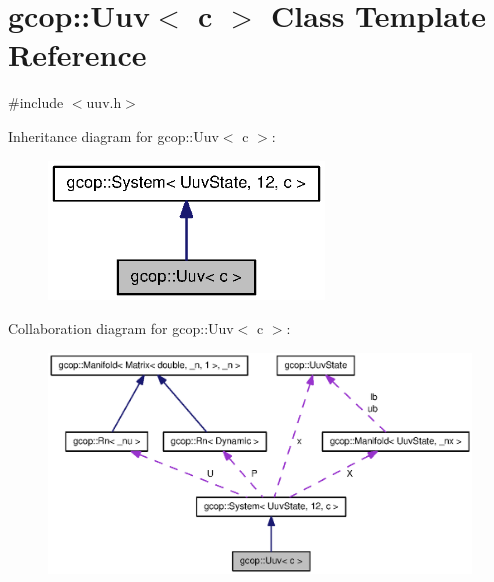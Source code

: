 \section{gcop\-:\-:\-Uuv$<$ c $>$ \-Class \-Template \-Reference}
\label{classgcop_1_1Uuv}


{\ttfamily \#include $<$uuv.\-h$>$}



\-Inheritance diagram for gcop\-:\-:\-Uuv$<$ c $>$\-:\nopagebreak
\begin{figure}[H]
\begin{center}
\leavevmode
\includegraphics[width=208pt]{classgcop_1_1Uuv__inherit__graph}
\end{center}
\end{figure}


\-Collaboration diagram for gcop\-:\-:\-Uuv$<$ c $>$\-:\nopagebreak
\begin{figure}[H]
\begin{center}
\leavevmode
\includegraphics[width=350pt]{classgcop_1_1Uuv__coll__graph}
\end{center}
\end{figure}
